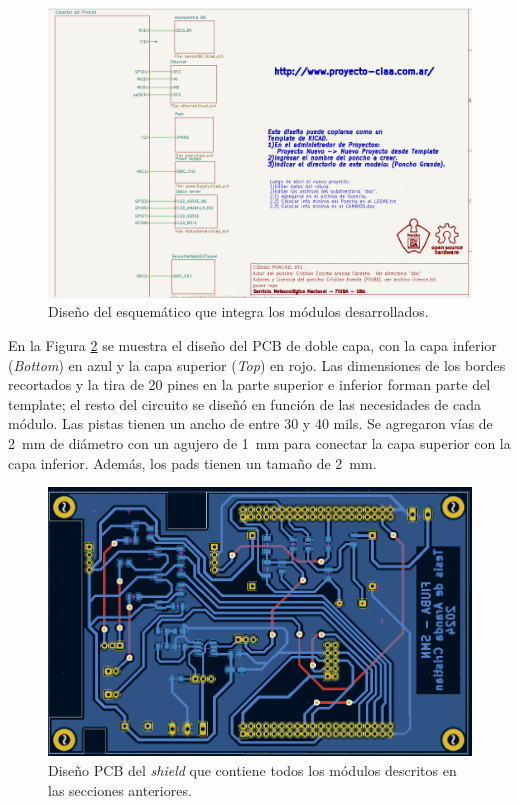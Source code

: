 \begin{figure}[H]
    \centering
    \includegraphics[width=0.90\linewidth]{Figuras/datalogger/Hardware/esquematicoPonchoDatalogger.png}
    \caption{Diseño del esquemático que integra los módulos desarrollados.}
    \label{fig:esquematicoPonchoDatalogger}
\end{figure}




En la Figura \ref{fig:pcbDesing} se muestra el diseño del PCB de doble capa, con la capa inferior (\textit{Bottom}) en azul y la capa superior (\textit{Top}) en rojo. Las dimensiones de los bordes recortados y la tira de 20 pines en la parte superior e inferior forman parte del template; el resto del circuito se diseñó en función de las necesidades de cada módulo. Las pistas tienen un ancho de entre 30 y 40 mils. Se agregaron vías de \SI{2}{\milli\meter} de diámetro con un agujero de \SI{1}{\milli\meter} para conectar la capa superior con la capa inferior. Además, los pads tienen un tamaño de \SI{2}{\milli\meter}.


\begin{figure}[H]
    \centering
    \includegraphics[width=0.95\linewidth]{Figuras/datalogger/Hardware/pcbDesing.png}
    \caption{Diseño PCB del \textit{shield} que contiene todos los módulos descritos en las secciones anteriores.}
    \label{fig:pcbDesing}
\end{figure}

